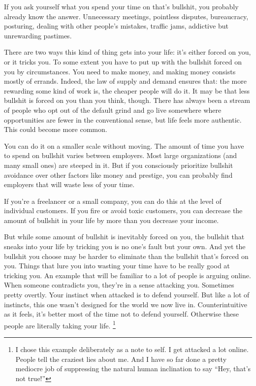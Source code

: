 \documentclass[12pt]{book}
\begin{document}
If you ask yourself what you spend your time on that's bullshit, you
probably already know the answer. Unnecessary meetings, pointless
disputes, bureaucracy, posturing, dealing with other people's mistakes,
traffic jams, addictive but unrewarding pastimes.

There are two ways this kind of thing gets into your life: it's either
forced on you, or it tricks you. To some extent you have to put up with
the bullshit forced on you by circumstances. You need to make money, and
making money consists mostly of errands. Indeed, the law of supply and
demand ensures that: the more rewarding some kind of work is, the
cheaper people will do it. It may be that less bullshit is forced on you
than you think, though. There has always been a stream of people who opt
out of the default grind and go live somewhere where opportunities are
fewer in the conventional sense, but life feels more authentic. This
could become more common.

You can do it on a smaller scale without moving. The amount of time you
have to spend on bullshit varies between employers. Most large
organizations (and many small ones) are steeped in it. But if you
consciously prioritize bullshit avoidance over other factors like money
and prestige, you can probably find employers that will waste less of
your time.

If you're a freelancer or a small company, you can do this at the level
of individual customers. If you fire or avoid toxic customers, you can
decrease the amount of bullshit in your life by more than you decrease
your income.

But while some amount of bullshit is inevitably forced on you, the
bullshit that sneaks into your life by tricking you is no one's fault
but your own. And yet the bullshit you choose may be harder to eliminate
than the bullshit that's forced on you. Things that lure you into
wasting your time have to be really good at tricking you. An example
that will be familiar to a lot of people is arguing online. When someone
contradicts you, they're in a sense attacking you. Sometimes pretty
overtly. Your instinct when attacked is to defend yourself. But like a
lot of instincts, this one wasn't designed for the world we now live in.
Counterintuitive as it feels, it's better most of the time not to defend
yourself. Otherwise these people are literally taking your life.
\footnote{I chose this example deliberately as a note to self. I get
attacked a lot online. People tell the craziest lies about me. And I
have so far done a pretty mediocre job of suppressing the natural human
inclination to say ``Hey, that's not true!''}
\end{document}
